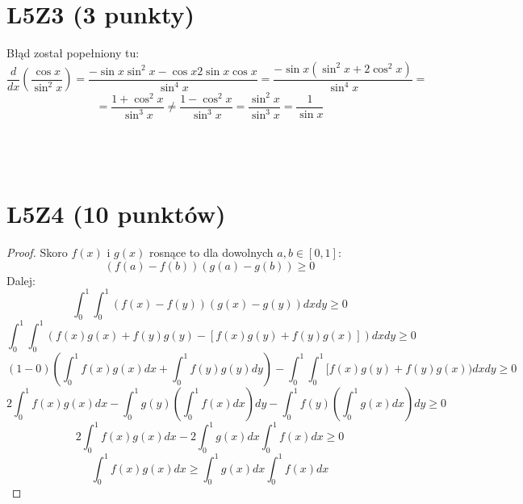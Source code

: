 \documentclass{article}
\title{}
\date{31.03.2020}
\author{Maurycy Borkowski}
\begin{document}
\maketitle

\section{L5Z3 (3 punkty)}
Błąd został popełniony tu:
$$
\frac{d}{dx}\left(\frac{\cos{x}}{\sin^2{x}}\right) = \frac{-\sin x \sin^2 x - \cos x 2 \sin x \cos x}{\sin^4 x} = \frac{-\sin x (\sin^2 x + 2 \cos^2 x)}{\sin^4 x} =
$$
$$
= \frac{1 + \cos^2 x}{\sin^3 x} \neq \frac{1- \cos^2 x}{\sin^3 x} = \frac{\sin^2 x}{\sin^3 x} = \frac{1}{\sin x}
$$
\\\\\\
\section{L5Z4 (10 punktów)}
\begin{proof}
Skoro $f(x)$ i $g(x)$ rosnące to dla dowolnych $a,b \in [0,1]$:
$$
(f(a) - f(b))(g(a)-g(b)) \geq 0
$$
Dalej:
$$
\int_0^1 \int_0^1 (f(x) - f(y))(g(x)-g(y)) dxdy \geq 0
$$
$$
\int_0^1 \int_0^1 (f(x)g(x) + f(y)g(y) - [f(x)g(y) + f(y)g(x)]) dxdy \geq 0
$$
$$
(1-0)\left(\int_0^1 f(x)g(x)dx  + \int_0^1 f(y)g(y)dy \right)- \int_0^1 \int_0^1 [f(x)g(y) + f(y)g(x)) dxdy \geq 0
$$
$$
2\int_0^1 f(x)g(x)dx  - \int_0^1 g(y) \left(\int_0^1 f(x)dx\right)dy - \int_0^1 f(y) \left(\int_0^1 g(x)dx\right)dy\geq 0
$$
$$
2\int_0^1 f(x)g(x)dx  - 2\int_0^1 g(x)dx \int_0^1  f(x)dx\geq 0
$$
$$
\int_0^1 f(x)g(x)dx  \geq \int_0^1 g(x)dx \int_0^1  f(x)dx
$$
\end{proof}
\end{document}
